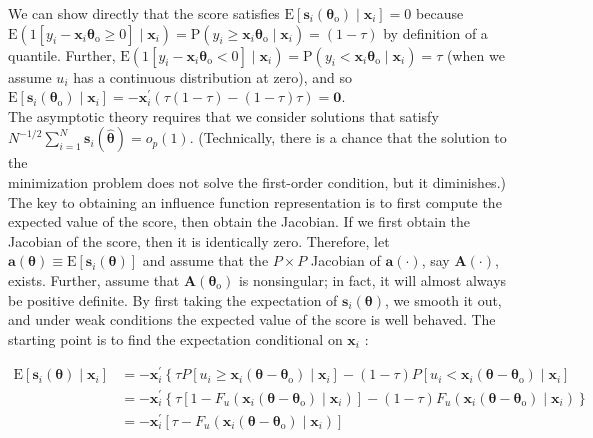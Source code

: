 \documentclass[10pt]{article}
\begin{document}
We can show directly that the score satisfies $\mathrm{E}\left[\mathbf{s}_{i}\left(\boldsymbol{\theta}_{\mathrm{o}}\right) \mid \mathbf{x}_{i}\right]=0$ because $\mathrm{E}\left(1\left[y_{i}-\mathbf{x}_{i} \boldsymbol{\theta}_{\mathrm{o}} \geq 0\right] \mid \mathbf{x}_{i}\right)=\mathrm{P}\left(y_{i} \geq \mathbf{x}_{i} \boldsymbol{\theta}_{\mathrm{o}} \mid \mathbf{x}_{i}\right)=(1-\tau)$ by definition of a quantile. Further, $\mathrm{E}\left(1\left[y_{i}-\mathbf{x}_{i} \boldsymbol{\theta}_{\mathrm{o}}<0\right] \mid \mathbf{x}_{i}\right)=\mathrm{P}\left(y_{i}<\mathbf{x}_{i} \boldsymbol{\theta}_{\mathrm{o}} \mid \mathbf{x}_{i}\right)=\tau$ (when we assume $u_{i}$ has a continuous distribution at zero), and so\\
$\mathrm{E}\left[\mathbf{s}_{i}\left(\boldsymbol{\theta}_{\mathrm{o}}\right) \mid \mathbf{x}_{i}\right]=-\mathbf{x}_{i}^{\prime}(\tau(1-\tau)-(1-\tau) \tau)=\mathbf{0}$.\\
The asymptotic theory requires that we consider solutions that satisfy $N^{-1 / 2} \sum_{i=1}^{N} \mathbf{s}_{i}(\hat{\boldsymbol{\theta}})=o_{p}(1)$. (Technically, there is a chance that the solution to the\\
minimization problem does not solve the first-order condition, but it diminishes.) The key to obtaining an influence function representation is to first compute the expected value of the score, then obtain the Jacobian. If we first obtain the Jacobian of the score, then it is identically zero. Therefore, let $\mathbf{a}(\boldsymbol{\theta}) \equiv \mathrm{E}\left[\mathbf{s}_{i}(\boldsymbol{\theta})\right]$ and assume that the $P \times P$ Jacobian of $\mathbf{a}(\cdot)$, say $\mathbf{A}(\cdot)$, exists. Further, assume that $\mathbf{A}\left(\boldsymbol{\theta}_{\mathrm{o}}\right)$ is nonsingular; in fact, it will almost always be positive definite. By first taking the expectation of $\mathbf{s}_{i}(\boldsymbol{\theta})$, we smooth it out, and under weak conditions the expected value of the score is well behaved. The starting point is to find the expectation conditional on $\mathbf{x}_{i}$ :


\begin{align*}
\mathrm{E}\left[\mathbf{s}_{i}(\boldsymbol{\theta}) \mid \mathbf{x}_{i}\right] & =-\mathbf{x}_{i}^{\prime}\left\{\tau P\left[u_{i} \geq \mathbf{x}_{i}\left(\boldsymbol{\theta}-\boldsymbol{\theta}_{\mathrm{o}}\right) \mid \mathbf{x}_{i}\right]-(1-\tau) P\left[u_{i}<\mathbf{x}_{i}\left(\boldsymbol{\theta}-\boldsymbol{\theta}_{\mathrm{o}}\right) \mid \mathbf{x}_{i}\right]\right. \\
& =-\mathbf{x}_{i}^{\prime}\left\{\tau\left[1-F_{u}\left(\mathbf{x}_{i}\left(\boldsymbol{\theta}-\boldsymbol{\theta}_{\mathrm{o}}\right) \mid \mathbf{x}_{i}\right)\right]-(1-\tau) F_{u}\left(\mathbf{x}_{i}\left(\boldsymbol{\theta}-\boldsymbol{\theta}_{\mathrm{o}}\right) \mid \mathbf{x}_{i}\right)\right\} \\
& =-\mathbf{x}_{i}^{\prime}\left[\tau-F_{u}\left(\mathbf{x}_{i}\left(\boldsymbol{\theta}-\boldsymbol{\theta}_{\mathrm{o}}\right) \mid \mathbf{x}_{i}\right)\right] \tag{12.111}
\end{align*}
\end{document}
